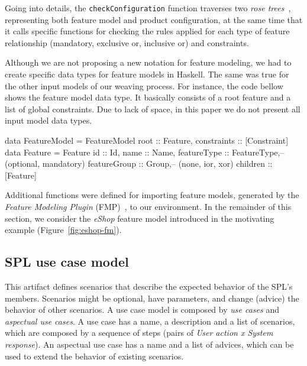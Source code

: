 Going into details, the \texttt{checkConfiguration} function traverses two
\emph{rose trees}~\cite{Hinze:2007aa}, representing both feature model and
product configuration, at the same time that it calls specific functions for
checking the rules applied for each type of feature relationship
(mandatory, exclusive or, inclusive or) and constraints. 


Although we are not proposing a new notation for feature modeling, we
had to create specific data types for feature models in Haskell.  The same was
true for the other input models of our weaving process. For instance, the code
bellow shows the feature model data type. It basically consists of a root feature
and a list of global constraints. Due to lack of space, in this paper we do not
present all input model data types.

\begin{code}
data FeatureModel = FeatureModel {
	root :: Feature,
	constraints :: [Constraint]
} 
data Feature = Feature  { 
  id :: Id, 
  name :: Name, 
  featureType :: FeatureType,-- (optional, mandatory)
  featureGroup :: Group,-- (none, ior, xor)
  children :: [Feature]
} 
 \end{code}
 
Additional functions were defined for importing feature models, generated by the
\emph{Feature Modeling Plugin} (FMP)~\cite{Czarnecki:2004aa}, to our
environment. In the remainder of this section, we consider the \emph{eShop}
feature model introduced in the motivating example (Figure~\ref{fig:eshop-fm}). 


\subsection{SPL use case model}\label{sub:spl-uc}

This artifact defines scenarios that describe the expected behavior of the SPL's
members. Scenarios might be optional, have parameters, and change (advice) the
behavior of other scenarios. A use case model is composed by \emph{use cases} and
\emph{aspectual use cases}. A use case has a name, a description and a list of
scenarios, which are composed by a sequence of steps (pairs of \emph{User action x
System response}). An aspectual use case has a name and a list of advices, which
can be used to extend the behavior of existing scenarios.

